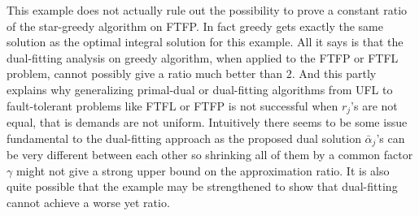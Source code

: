 \documentclass{article}
\begin{document}
This example does not actually rule out the possibility to prove a
constant ratio of the star-greedy algorithm on FTFP. In fact greedy
gets exactly the same solution as the optimal integral solution for
this example. All it says is that the dual-fitting analysis on greedy
algorithm, when applied to the FTFP or FTFL problem, cannot possibly
give a ratio much better than $2$. And this partly explains why
generalizing primal-dual or dual-fitting algorithms from UFL to
fault-tolerant problems like FTFL or FTFP is not successful when
$r_j$'s are not equal, that is demands are not uniform. Intuitively
there seems to be some issue fundamental to the dual-fitting approach
as the proposed dual solution $\bar\alpha_j$'s can be very different
between each other so shrinking all of them by a common factor
$\gamma$ might not give a strong upper bound on the approximation
ratio. It is also quite possible that the example may be strengthened
to show that dual-fitting cannot achieve a worse yet ratio.
\end{document}
